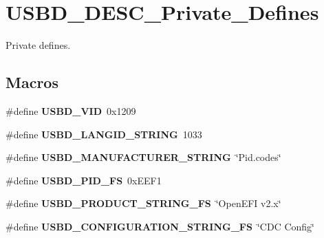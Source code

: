 \hypertarget{group__USBD__DESC__Private__Defines}{}\section{U\+S\+B\+D\+\_\+\+D\+E\+S\+C\+\_\+\+Private\+\_\+\+Defines}
\label{group__USBD__DESC__Private__Defines}


Private defines.  


\subsection*{Macros}
\begin{DoxyCompactItemize}
\item 
\mbox{\label{group__USBD__DESC__Private__Defines_gac5251397ce2246b546b472cd802e6d62}} 
\#define {\bfseries U\+S\+B\+D\+\_\+\+V\+ID}~0x1209
\item 
\mbox{\label{group__USBD__DESC__Private__Defines_ga070dd542d4d914e86fdf103fa5fdd72f}} 
\#define {\bfseries U\+S\+B\+D\+\_\+\+L\+A\+N\+G\+I\+D\+\_\+\+S\+T\+R\+I\+NG}~1033
\item 
\mbox{\label{group__USBD__DESC__Private__Defines_gaee0c9fd7e8265b90126028919cd863a6}} 
\#define {\bfseries U\+S\+B\+D\+\_\+\+M\+A\+N\+U\+F\+A\+C\+T\+U\+R\+E\+R\+\_\+\+S\+T\+R\+I\+NG}~\char`\"{}Pid.\+codes\char`\"{}
\item 
\mbox{\label{group__USBD__DESC__Private__Defines_gaa6f9e36da39c9881963cabf42df4d216}} 
\#define {\bfseries U\+S\+B\+D\+\_\+\+P\+I\+D\+\_\+\+FS}~0x\+E\+E\+F1
\item 
\mbox{\label{group__USBD__DESC__Private__Defines_gaa11017e20e3a2f1ef891b86212c4b730}} 
\#define {\bfseries U\+S\+B\+D\+\_\+\+P\+R\+O\+D\+U\+C\+T\+\_\+\+S\+T\+R\+I\+N\+G\+\_\+\+FS}~\char`\"{}Open\+E\+FI v2.\+x\char`\"{}
\item 
\mbox{\label{group__USBD__DESC__Private__Defines_gaca5e66e8b6c89a896f6ad16f9a68128f}} 
\#define {\bfseries U\+S\+B\+D\+\_\+\+C\+O\+N\+F\+I\+G\+U\+R\+A\+T\+I\+O\+N\+\_\+\+S\+T\+R\+I\+N\+G\+\_\+\+FS}~\char`\"{}C\+DC Config\char`\"{}

\end{DoxyCompactItemize}
